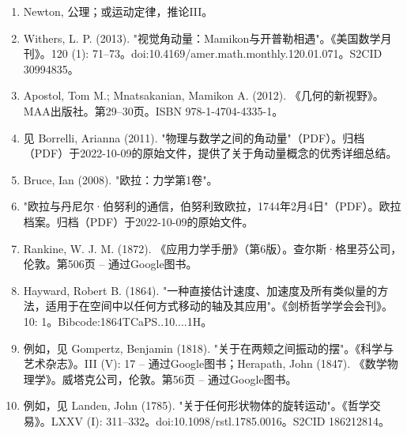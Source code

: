 \begin{enumerate}
\item Newton, 公理；或运动定律，推论III。
\item Withers, L. P. (2013). "视觉角动量：Mamikon与开普勒相遇"。《美国数学月刊》。120 (1): 71–73。doi:10.4169/amer.math.monthly.120.01.071。S2CID 30994835。
\item Apostol, Tom M.; Mnatsakanian, Mamikon A. (2012). 《几何的新视野》。MAA出版社。第29–30页。ISBN 978-1-4704-4335-1。
\item 见 Borrelli, Arianna (2011). "物理与数学之间的角动量"（PDF）。归档（PDF）于2022-10-09的原始文件，提供了关于角动量概念的优秀详细总结。
\item Bruce, Ian (2008). "欧拉：力学第1卷"。
\item "欧拉与丹尼尔·伯努利的通信，伯努利致欧拉，1744年2月4日"（PDF）。欧拉档案。归档（PDF）于2022-10-09的原始文件。
\item Rankine, W. J. M. (1872). 《应用力学手册》（第6版）。查尔斯·格里芬公司，伦敦。第506页 – 通过Google图书。
\item Hayward, Robert B. (1864). "一种直接估计速度、加速度及所有类似量的方法，适用于在空间中以任何方式移动的轴及其应用"。《剑桥哲学学会会刊》。10: 1。Bibcode:1864TCaPS..10....1H。
\item 例如，见 Gompertz, Benjamin (1818). "关于在两颊之间振动的摆"。《科学与艺术杂志》。III (V): 17 – 通过Google图书；Herapath, John (1847). 《数学物理学》。威塔克公司，伦敦。第56页 – 通过Google图书。
\item 例如，见 Landen, John (1785). "关于任何形状物体的旋转运动"。《哲学交易》。LXXV (I): 311–332。doi:10.1098/rstl.1785.0016。S2CID 186212814。
\end{enumerate}



